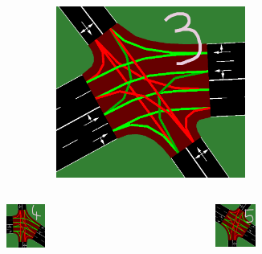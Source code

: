 \documentclass[dvipsnames]{beamer}
\begin{document}
\begin{frame}
\begin{columns}
\begin{column}{0.3\textwidth}
\begin{figure}
      \end{figure}
    \end{column}
    \begin{column}{0.3\textwidth}
      \begin{figure}
        \centering
        \includegraphics[width=0.65\textwidth]{figures/sumo-rf-tls-3.png}
      \end{figure}
    \end{column}
  \end{columns}
  \begin{columns}
    \begin{column}{0.5\textwidth}
      \begin{figure}
        \centering
        \includegraphics[width=0.30\textwidth]{figures/sumo-rf-tls-4.png}
      \end{figure}
    \end{column}
    \begin{column}{0.5\textwidth}
      \begin{figure}
        \centering
        \includegraphics[width=0.30\textwidth]{figures/sumo-rf-tls-5.png}
      \end{figure}
    \end{column}
  \end{columns}
\end{frame}
\end{document}
